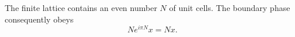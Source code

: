 \documentclass{article}
\begin{document}
The finite lattice contains an even number $N$ of unit cells.  The boundary
phase consequently obeys
\begin{equation}
N e^{i\pi N} x = N x .
\label{eq:even-periodicity}
\end{equation}
\end{document}
